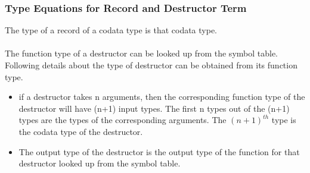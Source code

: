 \documentclass[11pt]{article}
\begin{document}
\subsubsection {Type Equations for Record and Destructor Term}

The type of a {\sf record} of a codata type is that codata type.
~~\\~~\\ 
The function type of a destructor can be looked up from the symbol table. Following details about the type of destructor can be obtained from its function type.
\begin{itemize}
  \item if a destructor takes n arguments, then the corresponding function type of the destructor will have (n+1) input types. The first n types out of the (n+1) types are the types of the corresponding arguments. The $(n+1)^{th}$ type is the codata type of the destructor.
  \item The output type of the destructor is the output type of the function for that destructor looked up from the symbol table.    
\end{itemize}
\end{document}
